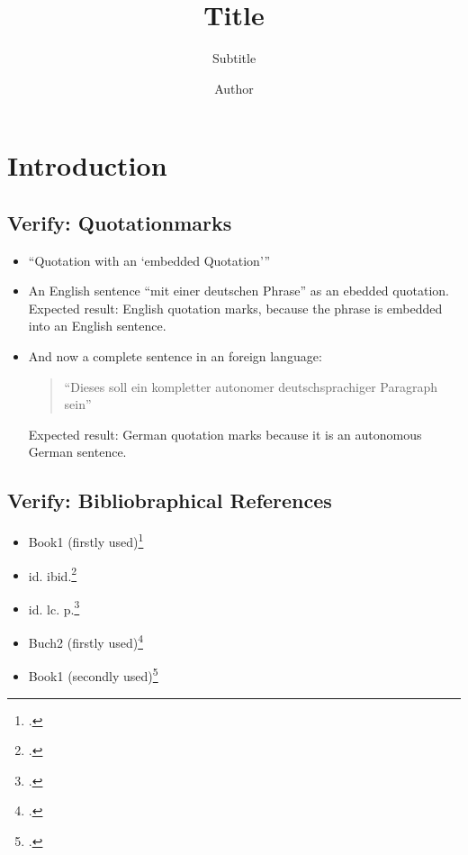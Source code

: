 \documentclass[
  DIV=calc,
  BCOR=5mm,
  11pt,
  headings=small,
  oneside,
  abstract=true,
  toc=bib,
  ngerman,english]{scrbook}
\begin{document}
\nocite{*}

\titlehead{Classification}
\subject{Release }
\title{Title}
\subtitle{Subtitle}
\author{Author}


\maketitle

\footnotesize
\tableofcontents

\normalsize
\chapter{Introduction}

\section{Verify: Quotationmarks}


\begin{itemize}

  \item \enquote{Quotation with an \enquote{embedded Quotation}}

  \item An English sentence \foreignquote{english}{mit einer deutschen Phrase} 
  as an ebedded quotation. Expected result: English quotation marks, because
  the phrase is embedded into an English sentence.
  
  \item And now a complete sentence in an foreign language:
  \begin{quote}
    \foreignquote{german}{Dieses soll ein kompletter autonomer deutschsprachiger
    Paragraph sein}
  \end{quote}
  Expected result: German quotation marks because it is an autonomous German sentence.
\end{itemize}

\section{Verify:  Bibliobraphical References}
\begin{itemize}
  \item Book1 (firstly used)\footcite[cf.][15]{Allen2001a}
  \item id. ibid.\footcite[cf.][15]{Allen2001a}
  \item id. lc. p.\footcite[cf.][23]{Allen2001a}
  \item Buch2 (firstly used)\footcite[cf.][15]{ModLanAss2009a}
  \item Book1 (secondly used)\footcite[cf.][15]{Allen2001a}
\end{itemize}
\end{document}
